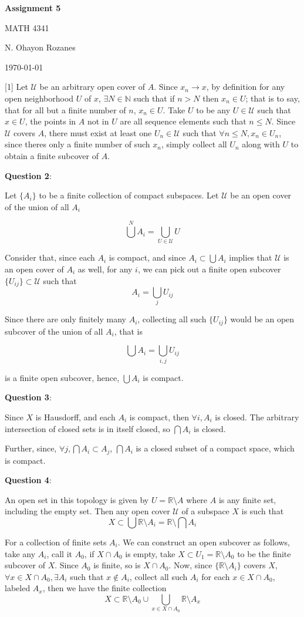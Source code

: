 \documentclass{article} %
\newcommand{\question}[2][]{
  \begin{flushleft}
    \textbf{Question #1}: \textit{#2}

\end{flushleft}}
\newcommand{\maketitletwo}[2][]{
  \begin{center}
    \Large{\textbf{Assignment #1}

    MATH 4341} %
    \vspace{5pt}

    \normalsize{N. Ohayon Rozanes  %

    \today}        %
    \vspace{15pt}

\end{center}}
\begin{document}
\maketitletwo[5]

\question[1]{}
Let $\mathcal{U}$ be an arbitrary open cover of $A$. Since $x_n \to
x$, by definition for any open neighborhood $U$ of $x$, $\exists N
\in \mathbb{N}$ such that if $n>N$ then $x_n \in U$; that is to say,
that for all but a finite number of $n$, $x_n \in U$. Take $U$ to be
any $U \in \mathcal{U}$ such that $x\in U$, the points in $A$ not in
$U$ are all sequence elements such that $n \leq N$. Since
$\mathcal{U}$ covers $A$, there must exist at least one $U_n \in
\mathcal{U}$ such that $\forall n \leq N, x_n \in U_n$, since theres
only a finite number of such $x_n$, simply collect all $U_n$ along
with $U$ to obtain a finite subcover of $A$.

\question[2]{}

Let $\{A_i\}$ to be a finite collection of compact subspaces. Let
$\mathcal{U}$ be an open cover of the union of all $A_i$

\[
  \bigcup^N A_i = \bigcup_{U \in\mathcal{U}} U
\]

Consider that, since each $A_i$ is compact, and since $A_i \subset
\bigcup A_i$ implies that $\mathcal{U}$ is an open cover of $A_i$ as
well, for any $i$, we can pick out a finite open subcover $\{U_{ij}\}
\subset \mathcal{U}$ such that
\[
  A_i = \bigcup_j U_{ij}
\]

Since there are only finitely many $A_i$, collecting all such
$\{U_{ij}\}$ would be an open subcover of the union of all $A_i$, that is

\[
  \bigcup A_i = \bigcup_{i,j} U_{ij}
\]

is a finite open subcover, hence, $\bigcup A_i$ is compact.

\question[3]{}

Since $X$ is Hausdorff, and each $A_i$ is compact, then $\forall i,
A_i$ is closed. The arbitrary intersection of closed sets is in
itself closed, so $\bigcap A_i$ is closed.

Further, since, $\forall j, \bigcap A_i \subset A_j$, $\bigcap A_i$
is a closed subset of a compact space, which is compact.

\question[4]{}

An open set in this topology is given by  $U =
\mathbb{R}\setminus A$ where $A$ is any finite set, including the
empty set. Then any open cover $\mathcal{U}$ of a subspace $X$ is such that
\[
  X  \subset \bigcup \mathbb{R} \setminus A_i = \mathbb{R} \setminus \bigcap A_i
\]

For a collection of finite sets $A_i$. We can construct an open
subcover as follows, take any $A_i$, call it $A_0$, if $X \cap A_0$
is empty, take $X \subset U_1 = \mathbb{R} \setminus A_0$ to be the
finite subcover of $X$. Since $A_0$ is finite, so is $X \cap A_0$.
Now, since $\{\mathbb{R}\setminus A_i\}$ covers $X$, $\forall x \in X
\cap A_0, \exists A_i$ such that
$x\notin A_i$, collect all such $A_i$ for each $x \in X \cap A_0$,
labeled $A_{x}$, then we have the finite collection
\[
  X \subset \mathbb{R} \setminus A_0 \cup \bigcup_{x\in X\cap A_0} \mathbb{R}
  \setminus A_{x}
\]
\end{document}
